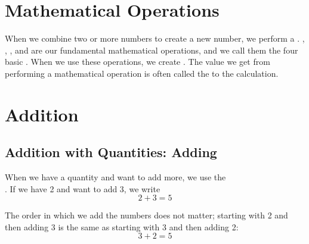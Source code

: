 




	\newpage
	\section{Mathematical Operations}
	When we combine two or more numbers to create a new number, we perform a . , , , and  are our fundamental mathematical operations, and we call them the four basic . When we use these operations, we create . The value we get from performing a mathematical operation is often called the  to the calculation.
	
	\section{Addition \label{Addisjon} }
	\subsection*{Addition with Quantities: Adding}
	When we have a quantity and want to add more, we use the  \\
	\sym{$ + $}
	\!\!. If we have 2 and want to add 3, we write
	\[ 2+3=5 \]
	
	The order in which we add the numbers does not matter; starting with 2 and then adding 3 is the same as starting with 3 and then adding 2:
	\[ 3+2=5 \]
	
	 \regv
	
	\newpage
	
